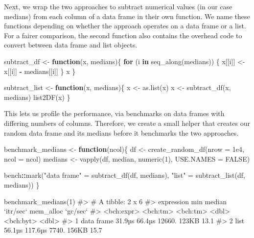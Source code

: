 \documentclass[
]{krantz}
\makeatletter
\newenvironment{Shaded}{\begin{snugshade}}{\end{snugshade}}
\newcommand{\CommentTok}[1]{\textcolor[rgb]{0.56,0.35,0.01}{\textit{#1}}}
\newcommand{\ControlFlowTok}[1]{\textcolor[rgb]{0.13,0.29,0.53}{\textbf{#1}}}
\newcommand{\DataTypeTok}[1]{\textcolor[rgb]{0.13,0.29,0.53}{#1}}
\newcommand{\DecValTok}[1]{\textcolor[rgb]{0.00,0.00,0.81}{#1}}
\newcommand{\FloatTok}[1]{\textcolor[rgb]{0.00,0.00,0.81}{#1}}
\newcommand{\KeywordTok}[1]{\textcolor[rgb]{0.13,0.29,0.53}{\textbf{#1}}}
\newcommand{\NormalTok}[1]{#1}
\newcommand{\OperatorTok}[1]{\textcolor[rgb]{0.81,0.36,0.00}{\textbf{#1}}}
\newcommand{\OtherTok}[1]{\textcolor[rgb]{0.56,0.35,0.01}{#1}}
\newcommand{\StringTok}[1]{\textcolor[rgb]{0.31,0.60,0.02}{#1}}
\newenvironment{kframe}{%
\medskip{}
\setlength{\fboxsep}{.8em}
 \def\at@end@of@kframe{}%
 \ifinner\ifhmode%
  \def\at@end@of@kframe{\end{minipage}}%
  \begin{minipage}{\columnwidth}%
 \fi\fi%
 \def\FrameCommand##1{\hskip\@totalleftmargin \hskip-\fboxsep
 \colorbox{shadecolor}{##1}\hskip-\fboxsep
     \hskip-\linewidth \hskip-\@totalleftmargin \hskip\columnwidth}%
 \MakeFramed {\advance\hsize-\width
   \@totalleftmargin\z@ \linewidth\hsize
   \@setminipage}}%
 {\par\unskip\endMakeFramed%
 \at@end@of@kframe}
\renewenvironment{Shaded}{\begin{kframe}}{\end{kframe}}
\renewcommand{\KeywordTok} [1]{\textcolor[rgb]{0.00,0.44,0.13}{{#1}}}
\renewcommand{\DataTypeTok}[1]{\textcolor[rgb]{0.56,0.13,0.00}{{#1}}}
\renewcommand{\DecValTok}  [1]{\textcolor[rgb]{0.25,0.63,0.44}{{#1}}}
\renewcommand{\FloatTok}   [1]{\textcolor[rgb]{0.25,0.63,0.44}{{#1}}}
\renewcommand{\StringTok}  [1]{\textcolor[rgb]{0.25,0.44,0.63}{{#1}}}
\renewcommand{\CommentTok} [1]{\textcolor[rgb]{0.38,0.63,0.69}{{#1}}}
\renewcommand{\OtherTok}   [1]{\textcolor[rgb]{0.00,0.44,0.13}{{#1}}}
\renewcommand{\NormalTok}  [1]{{#1}}
\makeatother
\begin{document}
Next, we wrap the two approaches to subtract numerical values (in our case medians) from each column of a data frame in their own function. We name these functions depending on whether the approach operates on a data frame or a list. For a fairer comparison, the second function also contains the overhead code to convert between data frame and list objects.

\begin{Shaded}
\begin{Highlighting}[]
\NormalTok{subtract_df <-}\StringTok{ }\ControlFlowTok{function}\NormalTok{(x, medians)\{}
  \ControlFlowTok{for}\NormalTok{ (i }\ControlFlowTok{in} \KeywordTok{seq_along}\NormalTok{(medians)) \{}
\NormalTok{    x[[i]] <-}\StringTok{ }\NormalTok{x[[i]] }\OperatorTok{-}\StringTok{ }\NormalTok{medians[[i]]}
\NormalTok{  \}}
\NormalTok{  x}
\NormalTok{\}}

\NormalTok{subtract_list <-}\StringTok{ }\ControlFlowTok{function}\NormalTok{(x, medians)\{}
\NormalTok{  x <-}\StringTok{ }\KeywordTok{as.list}\NormalTok{(x)}
\NormalTok{  x <-}\StringTok{ }\KeywordTok{subtract_df}\NormalTok{(x, medians)}
  \KeywordTok{list2DF}\NormalTok{(x)}
\NormalTok{\}}
\end{Highlighting}
\end{Shaded}

This lets us profile the performance, via benchmarks on data frames with differing numbers of columns. Therefore, we create a small helper that creates our random data frame and its medians before it benchmarks the two approaches.

\begin{Shaded}
\begin{Highlighting}[]
\NormalTok{benchmark_medians <-}\StringTok{ }\ControlFlowTok{function}\NormalTok{(ncol)\{}
\NormalTok{  df <-}\StringTok{ }\KeywordTok{create_random_df}\NormalTok{(}\DataTypeTok{nrow =} \FloatTok{1e4}\NormalTok{, }\DataTypeTok{ncol =}\NormalTok{ ncol)}
\NormalTok{  medians <-}\StringTok{ }\KeywordTok{vapply}\NormalTok{(df, median, }\KeywordTok{numeric}\NormalTok{(}\DecValTok{1}\NormalTok{), }\DataTypeTok{USE.NAMES =} \OtherTok{FALSE}\NormalTok{)}
  
\NormalTok{  bench}\OperatorTok{::}\KeywordTok{mark}\NormalTok{(}\StringTok{"data frame"}\NormalTok{ =}\StringTok{ }\KeywordTok{subtract_df}\NormalTok{(df, medians),}
              \StringTok{"list"}\NormalTok{       =}\StringTok{ }\KeywordTok{subtract_list}\NormalTok{(df, medians))}
\NormalTok{\}}

\KeywordTok{benchmark_medians}\NormalTok{(}\DecValTok{1}\NormalTok{)}
\CommentTok{#> # A tibble: 2 x 6}
\CommentTok{#>   expression      min   median `itr/sec` mem_alloc `gc/sec`}
\CommentTok{#>   <bch:expr> <bch:tm> <bch:tm>     <dbl> <bch:byt>    <dbl>}
\CommentTok{#> 1 data frame   31.9µs   66.4µs    12660.     123KB     13.1}
\CommentTok{#> 2 list         56.1µs  117.6µs     7740.     156KB     15.7}
\end{Highlighting}
\end{Shaded}
\end{document}
